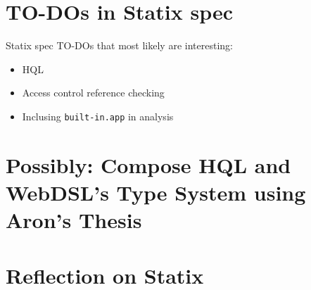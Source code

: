   \section{TO-DOs in Statix spec}
  
    Statix spec TO-DOs that most likely are interesting:
    \begin{itemize}
      \item HQL
      \item Access control reference checking
      \item Inclusing \texttt{built-in.app} in analysis
    \end{itemize}

  \section{Possibly: Compose HQL and WebDSL's Type System using Aron's Thesis}

  \section{Reflection on Statix}
